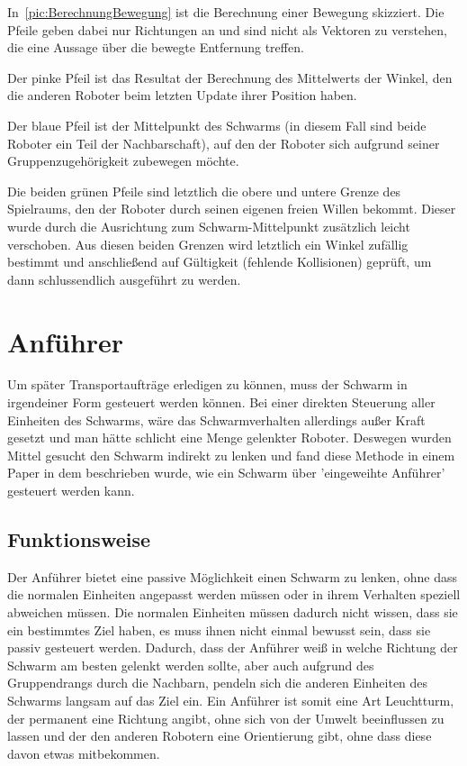 In~\autoref{pic:BerechnungBewegung} ist die Berechnung einer Bewegung skizziert. Die Pfeile geben dabei nur Richtungen an und sind nicht als Vektoren zu verstehen, die eine Aussage über die bewegte Entfernung treffen.

Der pinke Pfeil ist das Resultat der Berechnung des Mittelwerts der Winkel, den die anderen Roboter beim letzten Update ihrer Position haben.

Der blaue Pfeil ist der Mittelpunkt des Schwarms (in diesem Fall sind beide Roboter ein Teil der Nachbarschaft), auf den der Roboter sich aufgrund seiner Gruppenzugehörigkeit zubewegen möchte.

Die beiden grünen Pfeile sind letztlich die obere und untere Grenze des Spielraums, den der Roboter durch seinen eigenen freien Willen bekommt. Dieser wurde durch die Ausrichtung zum Schwarm-Mittelpunkt zusätzlich leicht verschoben. Aus diesen beiden Grenzen wird letztlich ein Winkel zufällig bestimmt und anschließend auf Gültigkeit (fehlende Kollisionen) geprüft, um dann schlussendlich ausgeführt zu werden.



\section{Anführer}

Um später Transportaufträge erledigen zu können, muss der Schwarm in irgendeiner Form gesteuert werden können. Bei einer direkten Steuerung aller Einheiten des Schwarms, wäre das Schwarmverhalten allerdings außer Kraft gesetzt und man hätte schlicht eine Menge gelenkter Roboter. Deswegen wurden Mittel gesucht den Schwarm indirekt zu lenken und fand diese Methode in einem Paper in dem beschrieben wurde, wie ein Schwarm über 'eingeweihte Anführer' gesteuert werden kann.\cite{VicsekLeader2}

\subsection*{Funktionsweise}
Der Anführer bietet eine passive Möglichkeit einen Schwarm zu lenken, ohne dass die normalen Einheiten angepasst werden müssen oder in ihrem Verhalten speziell abweichen müssen. Die normalen Einheiten müssen dadurch nicht wissen, dass sie ein bestimmtes Ziel haben, es muss ihnen nicht einmal bewusst sein, dass sie passiv gesteuert werden. Dadurch, dass der Anführer weiß in welche Richtung der Schwarm am besten gelenkt werden sollte, aber auch aufgrund des Gruppendrangs durch die Nachbarn, pendeln sich die anderen Einheiten des Schwarms langsam auf das Ziel ein. Ein Anführer ist somit eine Art Leuchtturm, der permanent eine Richtung angibt, ohne sich von der Umwelt beeinflussen zu lassen und der den anderen Robotern eine Orientierung gibt, ohne dass diese davon etwas mitbekommen.

